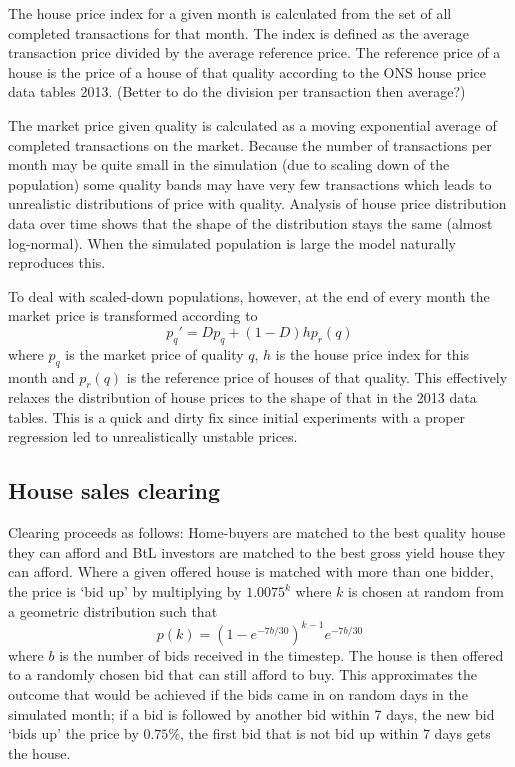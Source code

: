 \documentclass{article}
\begin{document}
The house price index for a given month is calculated from the set of all completed transactions for that month. The index is defined as the average transaction price divided by the average reference price. The reference price of a house is the price of a house of that quality according to the ONS house price data tables 2013. (Better to do the division per transaction then average?)

The market price given quality is calculated as a moving exponential average of completed transactions on the market. Because the number of transactions per month may be quite small in the simulation (due to scaling down of the population) some quality bands may have very few transactions which leads to unrealistic distributions of price with quality. Analysis of house price distribution data over time shows that the shape of the distribution stays the same (almost log-normal). When the simulated population is large the model naturally reproduces this.

To deal with scaled-down populations, however, at the end of every month the market price is transformed according to
\[
p_q' = Dp_q + (1-D)hp_r(q)
\]
where $p_q$ is the market price of quality $q$, $h$ is the house price index for this month and $p_r(q)$ is the reference price of houses of that quality. This effectively relaxes the distribution of house prices to the shape of that in the 2013 data tables. This is a quick and dirty fix since initial experiments with a proper regression led to unrealistically unstable prices.

\subsection{House sales clearing}

Clearing proceeds as follows: Home-buyers are matched to the best quality
house they can afford and BtL investors are matched to the best gross yield house they can afford. Where a given offered house is matched with more than one bidder, the price is `bid up' by multiplying by $1.0075^k$ where $k$ is chosen at random from a geometric distribution such that
\[
p(k) = (1-e^{-7b/30})^{k-1}e^{-7b/30}
\]
where $b$ is the number of bids received in the timestep. The house is then offered to a randomly chosen bid that can still afford to buy. This approximates the outcome that would be achieved if the bids came in on random days in the simulated month; if a bid is followed by another bid within 7 days, the new bid `bids up' the price by $0.75\%$, the first bid that is not bid up within 7 days gets the house.
\end{document}
